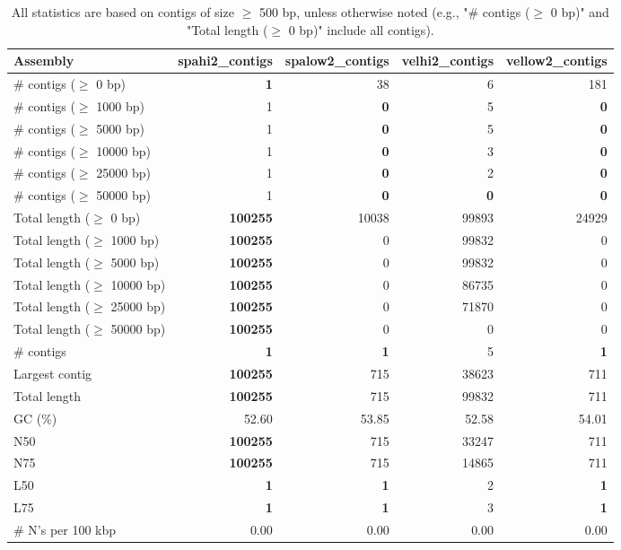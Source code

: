 \documentclass[12pt,a4paper]{article}
\begin{document}
\begin{table}[ht]
\begin{center}
\caption{All statistics are based on contigs of size $\geq$ 500 bp, unless otherwise noted (e.g., "\# contigs ($\geq$ 0 bp)" and "Total length ($\geq$ 0 bp)" include all contigs).}
\begin{tabular}{|l*{4}{|r}|}
\hline
Assembly & spahi2\_contigs & spalow2\_contigs & velhi2\_contigs & vellow2\_contigs \\ \hline
\# contigs ($\geq$ 0 bp) & {\bf 1} & 38 & 6 & 181 \\ \hline
\# contigs ($\geq$ 1000 bp) & 1 & {\bf 0} & 5 & {\bf 0} \\ \hline
\# contigs ($\geq$ 5000 bp) & 1 & {\bf 0} & 5 & {\bf 0} \\ \hline
\# contigs ($\geq$ 10000 bp) & 1 & {\bf 0} & 3 & {\bf 0} \\ \hline
\# contigs ($\geq$ 25000 bp) & 1 & {\bf 0} & 2 & {\bf 0} \\ \hline
\# contigs ($\geq$ 50000 bp) & 1 & {\bf 0} & {\bf 0} & {\bf 0} \\ \hline
Total length ($\geq$ 0 bp) & {\bf 100255} & 10038 & 99893 & 24929 \\ \hline
Total length ($\geq$ 1000 bp) & {\bf 100255} & 0 & 99832 & 0 \\ \hline
Total length ($\geq$ 5000 bp) & {\bf 100255} & 0 & 99832 & 0 \\ \hline
Total length ($\geq$ 10000 bp) & {\bf 100255} & 0 & 86735 & 0 \\ \hline
Total length ($\geq$ 25000 bp) & {\bf 100255} & 0 & 71870 & 0 \\ \hline
Total length ($\geq$ 50000 bp) & {\bf 100255} & 0 & 0 & 0 \\ \hline
\# contigs & {\bf 1} & {\bf 1} & 5 & {\bf 1} \\ \hline
Largest contig & {\bf 100255} & 715 & 38623 & 711 \\ \hline
Total length & {\bf 100255} & 715 & 99832 & 711 \\ \hline
GC (\%) & 52.60 & 53.85 & 52.58 & 54.01 \\ \hline
N50 & {\bf 100255} & 715 & 33247 & 711 \\ \hline
N75 & {\bf 100255} & 715 & 14865 & 711 \\ \hline
L50 & {\bf 1} & {\bf 1} & 2 & {\bf 1} \\ \hline
L75 & {\bf 1} & {\bf 1} & 3 & {\bf 1} \\ \hline
\# N's per 100 kbp & 0.00 & 0.00 & 0.00 & 0.00 \\ \hline
\end{tabular}
\end{center}
\end{table}
\end{document}
